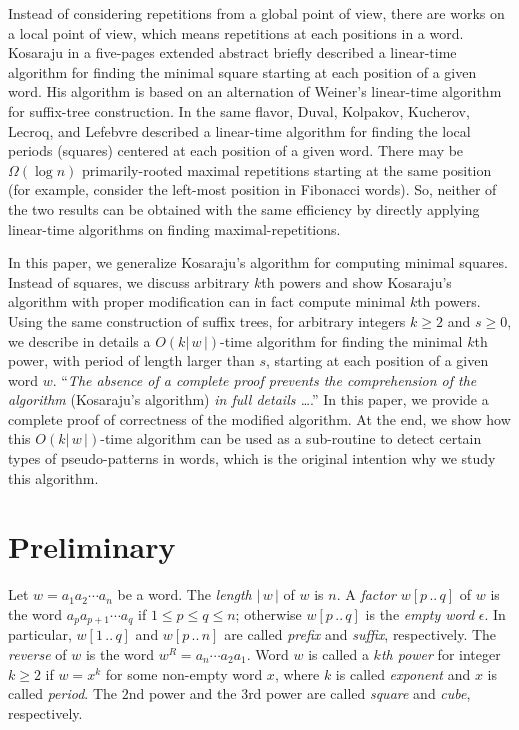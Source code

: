 \documentclass{article}
\def\subw#1#2#3{{#1[#2\,..\,#3]}}
\def\abs#1{{|\,#1\,|}}
\begin{document}
Instead of considering repetitions from a global point of view,
there are works on a local point of view, which means repetitions at
each positions in a word. Kosaraju in a five-pages extended abstract
\cite{Kosaraju1994} briefly described a linear-time algorithm for
finding the minimal square starting at each position of a given
word. His algorithm is based on an alternation of Weiner's
linear-time algorithm for suffix-tree construction. In the same
flavor, Duval, Kolpakov, Kucherov, Lecroq, and Lefebvre
\cite{Duval&Kolpakov&Kucherov&Lecroq&Lefebvre2004} described a
linear-time algorithm for finding the local periods (squares)
centered at each position of a given word. There may be $\Omega(\log
n)$ primarily-rooted maximal repetitions starting at the same
position (for example, consider the left-most position in Fibonacci
words). So, neither of the two results can be obtained with the same
efficiency by directly applying linear-time algorithms on finding
maximal-repetitions.


In this paper, we generalize Kosaraju's algorithm
\cite{Kosaraju1994} for computing minimal squares. Instead of
squares, we discuss arbitrary $k$th powers and show Kosaraju's
algorithm with proper modification can in fact compute minimal $k$th
powers. Using the same construction of suffix trees, for arbitrary
integers $k\geq2$ and $s\geq0$, we describe in details a
$O(k\abs{w})$-time algorithm for finding the minimal $k$th power,
with period of length larger than $s$, starting at each position of
a given word $w$. ``\emph{The absence of a complete proof prevents
the comprehension of the algorithm} (Kosaraju's algorithm) \emph{in
full details
\ldots}.''\cite{Duval&Kolpakov&Kucherov&Lecroq&Lefebvre2004} In this
paper, we provide a complete proof of correctness of the modified
algorithm. At the end, we show how this $O(k\abs{w})$-time algorithm
can be used as a sub-routine to detect certain types of
pseudo-patterns in words, which is the original intention why we
study this algorithm.


\section{Preliminary}
Let $w=a_1a_2\cdots a_n$ be a word. The \emph{length} $\abs{w}$ of
$w$ is $n$. A \emph{factor} $\subw{w}{p}{q}$ of $w$ is the word
$a_pa_{p+1}\cdots a_q$ if $1\leq p\leq q\leq n$; otherwise
$\subw{w}{p}{q}$ is the \emph{empty word} $\epsilon$. In particular,
$\subw{w}{1}{q}$ and $\subw{w}{p}{n}$ are called \emph{prefix} and
\emph{suffix}, respectively. The \emph{reverse} of $w$ is the word
$w^R=a_n\cdots a_2a_1$. Word $w$ is called a \emph{$k$th power} for
integer $k\geq2$ if $w=x^k$ for some non-empty word $x$, where $k$
is called \emph{exponent} and $x$ is called \emph{period}. The $2$nd
power and the $3$rd power are called \emph{square} and \emph{cube},
respectively.
\end{document}

